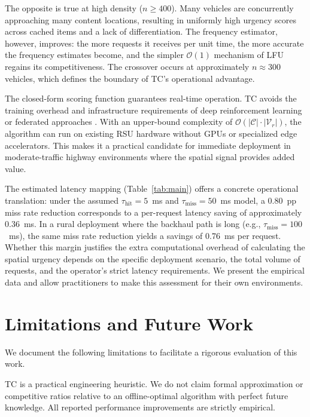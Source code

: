 \documentclass[preprint,12pt]{elsarticle}
\begin{document}
	The opposite is true at high density ($n \geq 400$). Many vehicles are concurrently approaching many content locations, resulting in uniformly high urgency scores across cached items and a lack of differentiation. The frequency estimator, however, improves: the more requests it receives per unit time, the more accurate the frequency estimates become, and the simpler $\mathcal{O}(1)$ mechanism of LFU regains its competitiveness. The crossover occurs at approximately $n \approx 300$ vehicles, which defines the boundary of TC's operational advantage.
	
	The closed-form scoring function guarantees real-time operation. TC avoids the training overhead and infrastructure requirements of deep reinforcement learning or federated approaches \cite{he2018mobility}. With an upper-bound complexity of $\mathcal{O}(|\mathcal{C}| \cdot |\mathcal{V}_r|)$, the algorithm can run on existing RSU hardware without GPUs or specialized edge accelerators. This makes it a practical candidate for immediate deployment in moderate-traffic highway environments where the spatial signal provides added value.
	
	The estimated latency mapping (Table~\ref{tab:main}) offers a concrete operational translation: under the assumed $\tau_\text{hit} = 5$~ms and $\tau_\text{miss} = 50$~ms model, a 0.80~pp miss rate reduction corresponds to a per-request latency saving of approximately 0.36~ms. In a rural deployment where the backhaul path is long (e.g., $\tau_\text{miss} = 100$~ms), the same miss rate reduction yields a savings of 0.76~ms per request. Whether this margin justifies the extra computational overhead of calculating the spatial urgency depends on the specific deployment scenario, the total volume of requests, and the operator's strict latency requirements. We present the empirical data and allow practitioners to make this assessment for their own environments.

	\section{Limitations and Future Work}

	\label{sec:limitations}
	
	We document the following limitations to facilitate a rigorous evaluation of this work.
	
	TC is a practical engineering heuristic. We do not claim formal approximation or competitive ratios relative to an offline-optimal algorithm with perfect future knowledge. All reported performance improvements are strictly empirical.
	
\end{document}

